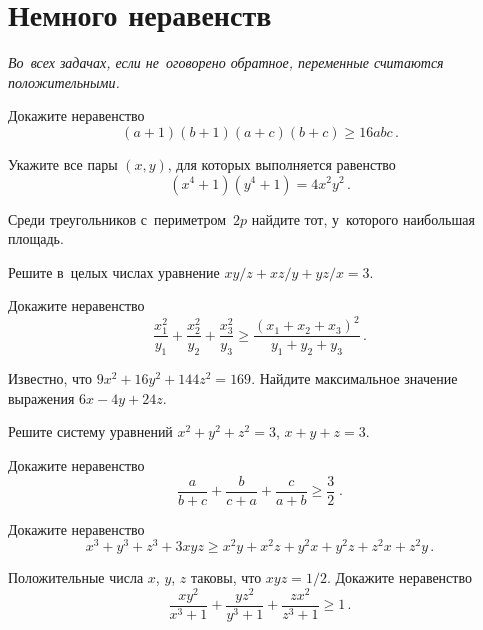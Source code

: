 
\section*{Немного неравенств}


\emph{Во~всех задачах, если не~оговорено обратное, переменные считаются
положительными.}

\begin{problems}

\item
Докажите неравенство
\[
    (a + 1) (b + 1) (a + c) (b + c)
\geq
    16 a b c
\, . \]

\item
Укажите все пары $(x, y)$, для которых выполняется равенство
\[
    (x^4 + 1) (y^4 + 1)
=
    4 x^2 y^2
\, . \]

\item
Среди треугольников с~периметром~$2 p$ найдите тот, у~которого наибольшая
площадь.

\item
Решите в~целых числах уравнение\enspace
\(
    x y / z + x z / y + y z / x
=
    3
\).

\item
Докажите неравенство
\[
    \frac{x_1^2}{y_1} + \frac{x_2^2}{y_2} + \frac{x_3^2}{y_3}
\geq
    \frac{(x_1 + x_2 + x_3)^2}{y_1 + y_2 + y_3}
\, . \]

\item
Известно, что\enspace
$9 x^2 + 16 y^2 + 144 z^2 = 169$.\enspace
Найдите максимальное значение выражения\enspace
$6 x - 4 y + 24 z$.

\item
Решите систему уравнений\enspace
$x^2 + y^2 + z^2 = 3$,\enspace
$x + y + z = 3$.


\item
Докажите неравенство
\[
    \frac{a}{b + c} + \frac{b}{c + a} + \frac{c}{a + b}
\geq
    \frac{3}{2}
\; . \]

\item
Докажите неравенство
\[
    x^3 + y^3 + z^3 + 3 x y z
\geq
    x^2 y + x^2 z + y^2 x + y^2 z + z^2 x + z^2 y
\, . \]

\item
Положительные числа $x$, $y$, $z$ таковы, что $x y z = 1 / 2$.
Докажите неравенство
\[
    \frac{x y^2}{x^3 + 1} + \frac{y z^2}{y^3 + 1} + \frac{z x^2}{z^3 + 1}
\geq
    1
\, . \]

\end{problems}

